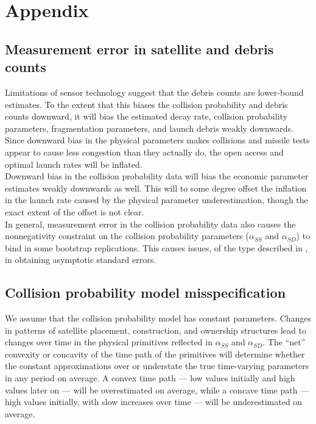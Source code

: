 \documentclass[12pt]{article}
\begin{document}
\newpage

\section{Appendix}

\subsection{Measurement error in satellite and debris counts}
\label{physicsMeasurementError}

Limitations of sensor technology suggest that the debris counts are lower-bound estimates. To the extent that this biases the collision probability and debris counts downward, it will bias the estimated decay rate, collision probability parameters, fragmentation parameters, and launch debris weakly downwards. Since downward bias in the physical parameters makes collisions and missile tests appear to cause less congestion than they actually do, the open access and optimal launch rates will be inflated.\\

Downward bias in the collision probability data will bias the economic parameter estimates weakly downwards as well. This will to some degree offset the inflation in the launch rate caused by the physical parameter underestimation, though the exact extent of the offset is not clear. \\

In general, measurement error in the collision probability data also causes the nonnegativity constraint on the collision probability parameters ($\alpha_{SS}$ and $\alpha_{SD}$) to bind in some bootstrap replications. This causes issues, of the type described in \citep{ketz2018}, in obtaining asymptotic standard errors.

\subsection{Collision probability model misspecification}

We assume that the collision probability model has constant parameters. Changes in patterns of satellite placement, construction, and ownership structures lead to changes over time in the physical primitives reflected in $\alpha_{SS}$ and $\alpha_{SD}$. The ``net'' convexity or concavity of the time path of the primitives will determine whether the constant approximations over or understate the true time-varying parameters in any period on average. A convex time path --- low values initially and high values later on --- will be overestimated on average, while a concave time path --- high values initially, with slow increases over time --- will be underestimated on average. \\
\end{document}
